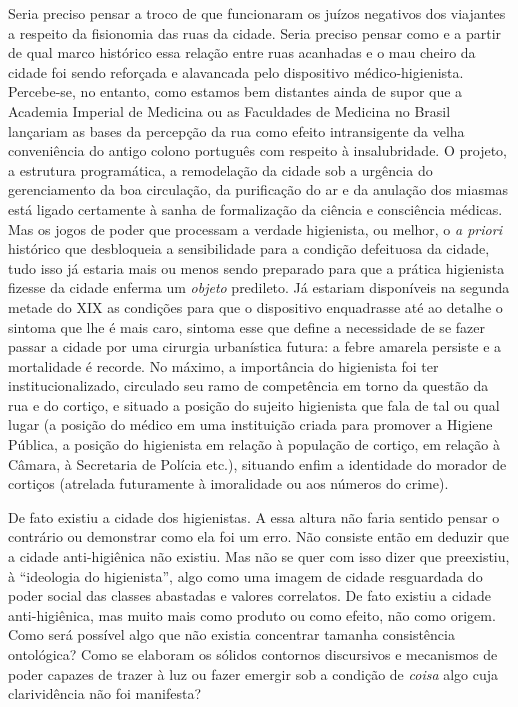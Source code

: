 Seria preciso pensar a troco de que funcionaram os juízos negativos dos
viajantes a respeito da fisionomia das ruas da cidade. Seria preciso
pensar como e a partir de qual marco histórico essa relação entre ruas
acanhadas e o mau cheiro da cidade foi sendo reforçada e alavancada pelo
dispositivo médico-higienista. Percebe-se, no entanto, como estamos bem
distantes ainda de supor que a Academia Imperial de Medicina ou as
Faculdades de Medicina no Brasil lançariam as bases da percepção da rua
como efeito intransigente da velha conveniência do antigo colono
português com respeito à insalubridade. O projeto, a estrutura
programática, a remodelação da cidade sob a urgência do gerenciamento da
boa circulação, da purificação do ar e da anulação dos miasmas está
ligado certamente à sanha de formalização da ciência e consciência
médicas. Mas os jogos de poder que processam a verdade higienista, ou
melhor, o \emph{a priori} histórico que desbloqueia a sensibilidade para
a condição defeituosa da cidade, tudo isso já estaria mais ou menos
sendo preparado para que a prática higienista fizesse da cidade enferma
um \emph{objeto} predileto. Já estariam disponíveis na segunda metade do
XIX as condições para que o dispositivo enquadrasse até ao detalhe o
sintoma que lhe é mais caro, sintoma esse que define a necessidade de se
fazer passar a cidade por uma cirurgia urbanística futura: a febre
amarela persiste e a mortalidade é recorde. No máximo, a importância do
higienista foi ter institucionalizado, circulado seu ramo de competência
em torno da questão da rua e do cortiço, e situado a posição do sujeito
higienista que fala de tal ou qual lugar (a posição do médico em uma
instituição criada para promover a Higiene Pública, a posição do
higienista em relação à população de cortiço, em relação à Câmara, à
Secretaria de Polícia etc.), situando enfim a identidade do morador de
cortiços (atrelada futuramente à imoralidade ou aos números do crime).

De fato existiu a cidade dos higienistas. A essa altura não faria
sentido pensar o contrário ou demonstrar como ela foi um erro. Não
consiste então em deduzir que a cidade anti-higiênica não existiu. Mas
não se quer com isso dizer que preexistiu, à ``ideologia do
higienista'', algo como uma imagem de cidade resguardada do poder social
das classes abastadas e valores correlatos. De fato existiu a cidade
anti-higiênica, mas muito mais como produto ou como efeito, não como
origem. Como será possível algo que não existia concentrar tamanha
consistência ontológica? Como se elaboram os sólidos contornos
discursivos e mecanismos de poder capazes de trazer à luz ou fazer
emergir sob a condição de \emph{coisa} algo cuja clarividência não foi
manifesta?


